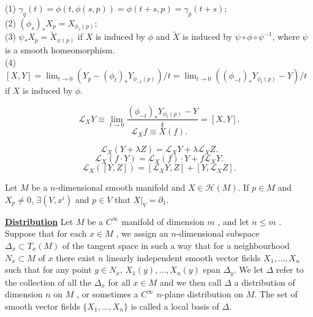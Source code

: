 \begin{newprop}
(1) $\gamma_q(t) = \phi(t,\phi(s,p)) = \phi(t+s,p) = \gamma_p(t+s)$;\\
(2) $(\phi_s)_{*}X_p = X_{\phi_s(p)}$;\\
(3) $\psi_{*} X_p = \tilde{X}_{\psi(p)}$ if $X$ is induced by $\phi$ and $\tilde{X}$ is induced by $\psi \circ \phi \circ \psi^{-1} $, where $\psi$ is a smooth  homeomorphism.\\
(4) $[X,Y] = \lim_{t \to 0} ({Y_p-(\phi_t)_* Y_{\phi_{-t}(p)}})/{t} = \lim_{t \to 0} ({(\phi_{-t})_*Y_{\phi_t(p)}- Y})/{t}$ if $X$ is induced by $\phi$.
\end{newprop}

\begin{newdef}
\[\mathscr{L}_{X}Y \equiv \lim_{t \to 0} \frac{(\phi_{-t})_*Y_{\phi_t(p)}- Y}{t} =[X,Y].\]
\[\mathscr{L}_{X}f \equiv X(f).\]
\end{newdef}

\begin{newprop}
\[\mathscr{L}_{X}(Y + \lambda Z) = \mathscr{L}_{X}Y + \lambda\mathscr{L}_{X}Z.\]
\[\mathscr{L}_{X}(f \cdot Y) = \mathscr{L}_{X}(f) \cdot Y + f\mathscr{L}_{X}Y.\]
\[\mathscr{L}_{X}([Y,Z]) = [\mathscr{L}_{X}Y,Z]+ [Y,\mathscr{L}_{X}Z].\]
\end{newprop}

\begin{newthem}
Let $M$ be a $n$-dimensional smooth manifold and $X \in \mathcal{H}(M)$. If $p \in M$ and $X_p \neq 0$, $\exists (V,x^i)$ and $p \in V$ that $X|_V = \partial_{1}$.
\end{newthem}

\begin{newdef}[Distribution]
\href{https://en.wikipedia.org/wiki/Distribution_(differential_geometry)}{\textbf{Distribution}} Let $M$ be a $C^{\infty }$  manifold of dimension $m$ , and let $n \leq m$ . Suppose that for each $x\in M$ , we assign an $n$-dimensional subspace $\Delta _{x}\subset T_{x}(M)$ of the tangent space in such a way that for a neighbourhood $N_{x}\subset M$ of $x$ there exist $n$ linearly independent smooth vector fields $X_{1},\ldots ,X_{n}$ such that for any point $y\in N_{x}$, $X_{1}(y),\ldots ,X_{n}(y)$ span $\Delta _{y}$. We let $\Delta$  refer to the collection of all the $\Delta_{x}$ for all $ x\in M$ and we then call $\Delta$ a distribution of dimension $n$ on $M$ , or sometimes a $C^{\infty }$ $n$-plane distribution on $M$. The set of smooth vector fields $\{X_{1},\ldots ,X_{n}\}$ is called a local basis of $\Delta$.
\end{newdef}

